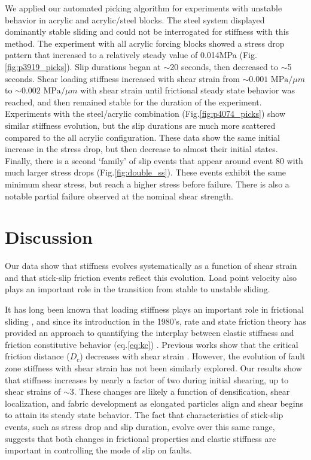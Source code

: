 We applied our automated picking algorithm for experiments with unstable
behavior in acrylic and acrylic/steel blocks.  The steel system displayed
dominantly stable sliding and could not be interrogated for stiffness with this
method.  The experiment with all acrylic forcing blocks showed a stress drop
pattern that increased to a relatively steady value of 0.014MPa
(Fig.\ref{fig:p3919_picks}).  Slip durations began at $\sim$20 seconds, then
decreased to $\sim$5 seconds.  Shear loading stiffness increased with shear
strain from $\sim 0.001 \text{ MPa}/\mu m$ to $\sim 0.002 \text{ MPa}/\mu m$
with shear strain until frictional steady state behavior was reached, and then
remained stable for the duration of the experiment.  Experiments with the
steel/acrylic combination (Fig.\ref{fig:p4074_picks}) show similar stiffness
evolution, but the slip durations are much more scattered compared to the all
acrylic configuration.  These data show the same initial increase in the stress
drop, but then decrease to almost their initial states.  Finally, there is a
second `family' of slip events that appear around event 80 with much larger
stress drops (Fig.\ref{fig:double_ss}).  These events exhibit the same minimum
shear stress, but reach a higher stress before failure.  There is also a notable
partial failure observed at the nominal shear strength.

\section{Discussion}

Our data show that stiffness evolves systematically as a function of shear
strain and that stick-slip friction events reflect this evolution.  Load point
velocity also plays an important role in the transition from stable to unstable
sliding.

It has long been known that loading stiffness plays an important role in
frictional sliding \cite{Jaeger_1971,Brace_1966}, and since its introduction in
the 1980's, rate and state friction theory has provided an approach to
quantifying the interplay between elastic stiffness and friction constitutive
behavior (eq.\ref{eq:kc}) \cite{rice1983constitutive}.  Previous works show that
the critical friction distance ($D_c$) decreases with shear strain
\cite{Marone_1993}.  However, the evolution of fault zone stiffness with shear
strain has not been similarly explored.  Our results show that stiffness
increases by nearly a factor of two during initial shearing, up to shear strains
of $\sim$3.  These changes are likely a function of densification, shear
localization, and fabric development as elongated particles align and shear
begins to attain its steady state behavior.  The fact that characteristics of
stick-slip events, such as stress drop and slip duration, evolve over this same
range, suggests that both changes in frictional properties and elastic stiffness
are important in controlling the mode of slip on faults.

